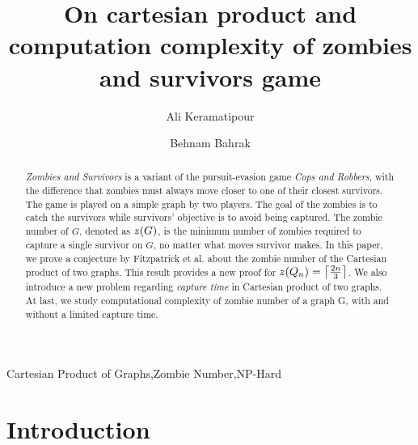 \documentclass[1p]{elsarticle}
\DeclarePairedDelimiter\ceil{\lceil}{\rceil} \DeclarePairedDelimiter\floor{\lfloor}{\rfloor}
\newcommand{\zn}{\ooalign{$z$\cr\hfil\rule[.5ex]{.2em}{.08ex}\hfil\cr}}
\begin{document}
	
	\begin{frontmatter}
		
		\title{On cartesian product and computation complexity of zombies and survivors game}
		
		
		\author{Ali Keramatipour}
		
		\author{Behnam Bahrak}
		
		\address{School of Electrical and Computer Engineering, College of Engineering, University of Tehran, Tehran, Iran}
		
		\begin{abstract}
		{\it Zombies and Survivors} is a variant of the pursuit-evasion game {\it Cops and Robbers}, with the difference
		that zombies must always move closer to one of their closest survivors. The game is played on a simple graph by
		two players. The goal of the zombies is to catch the survivors while survivors' objective is to avoid being
		captured. The zombie number of $G$, denoted as $\zn(G)$, is the minimum number of zombies required to capture a
		single survivor on $G$, no matter what moves survivor makes. In this paper, we prove a conjecture by Fitzpatrick
		et al.\cite{Fitz16} about the zombie number of the Cartesian product of two graphs. This result provides a new
		proof for $\zn(Q_n) = \ceil*{\frac{2n}{3}}$. We also introduce a new problem regarding {\it capture time} in
		Cartesian product of two graphs. At last, we study computational complexity of zombie number of a graph G, with
		and without a limited capture time.
		\end{abstract}
		
		\begin{keyword}
			Cartesian Product of Graphs\sep Zombie Number\sep NP-Hard
		\end{keyword}
		
	\end{frontmatter}
	
\section{Introduction}\label{section-introduction}
\end{document}
